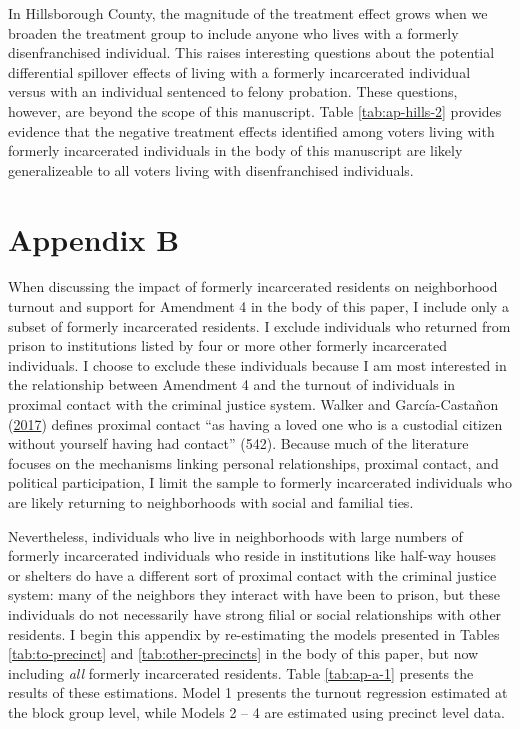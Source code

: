 \documentclass[
  12pt,
]{article}
\begin{document}
\begin{singlespace}

\end{singlespace}

In Hillsborough County, the magnitude of the treatment effect grows when we broaden the treatment group to include anyone who lives with a formerly disenfranchised individual. This raises interesting questions about the potential differential spillover effects of living with a formerly incarcerated individual versus with an individual sentenced to felony probation. These questions, however, are beyond the scope of this manuscript. Table \ref{tab:ap-hills-2} provides evidence that the negative treatment effects identified among voters living with formerly incarcerated individuals in the body of this manuscript are likely generalizeable to all voters living with disenfranchised individuals.

\newpage

\hypertarget{appendix-b}{%
\section*{Appendix B}\label{appendix-b}}

When discussing the impact of formerly incarcerated residents on neighborhood turnout and support for Amendment 4 in the body of this paper, I include only a subset of formerly incarcerated residents. I exclude individuals who returned from prison to institutions listed by four or more other formerly incarcerated individuals. I choose to exclude these individuals because I am most interested in the relationship between Amendment 4 and the turnout of individuals in proximal contact with the criminal justice system. Walker and García-Castañon (\protect\hyperlink{ref-Walker2017}{2017}) defines proximal contact ``as having a loved one who is a custodial citizen without yourself having had contact'' (542). Because much of the literature focuses on the mechanisms linking personal relationships, proximal contact, and political participation, I limit the sample to formerly incarcerated individuals who are likely returning to neighborhoods with social and familial ties.

Nevertheless, individuals who live in neighborhoods with large numbers of formerly incarcerated individuals who reside in institutions like half-way houses or shelters do have a different sort of proximal contact with the criminal justice system: many of the neighbors they interact with have been to prison, but these individuals do not necessarily have strong filial or social relationships with other residents. I begin this appendix by re-estimating the models presented in Tables \ref{tab:to-precinct} and \ref{tab:other-precincts} in the body of this paper, but now including \emph{all} formerly incarcerated residents. Table \ref{tab:ap-a-1} presents the results of these estimations. Model 1 presents the turnout regression estimated at the block group level, while Models 2 -- 4 are estimated using precinct level data.
\end{document}
